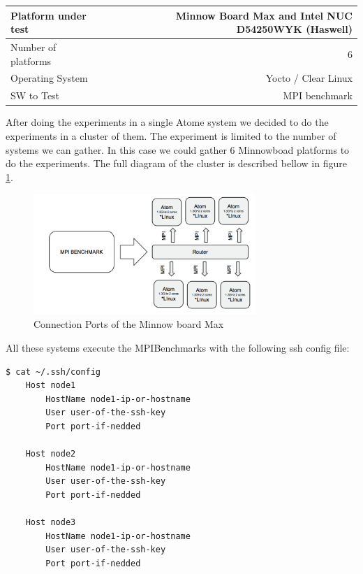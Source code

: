     \begin{center}
    \begin{tabular}{ | l | r |}
        \hline
        Platform under test & Minnow Board  Max and Intel NUC D54250WYK
        (Haswell)\\ \hline
        Number of platforms  & 6  \\ \hline
        Operating System & Yocto / Clear Linux  \\ \hline
        SW to Test & MPI benchmark \\ \hline
    \end{tabular}
    \end{center}

After doing the experiments in a single Atome system we decided to do the
experiments in a cluster of them. The experiment is limited to the number of
systems we can gather. In this case we could gather 6 Minnowboad
\cite{minnowboard} platforms to do the experiments. The full diagram of the
cluster is described bellow in figure \ref{fig:5.20}.

\begin{figure}[H]
\centering
\includegraphics[width=0.75\textwidth]{images/cluster_minnows.png}
\caption{Connection Ports of the Minnow board Max}
\label{fig:5.20}
\end{figure}

All these systems execute the MPIBenchmarks with the following ssh config file:


\begin{lstlisting}[frame=single,language=bash]
  $ cat ~/.ssh/config
    Host node1
        HostName node1-ip-or-hostname
        User user-of-the-ssh-key
        Port port-if-nedded

    Host node2
        HostName node1-ip-or-hostname
        User user-of-the-ssh-key
        Port port-if-nedded

    Host node3
        HostName node1-ip-or-hostname
        User user-of-the-ssh-key
        Port port-if-nedded

\end{lstlisting}

